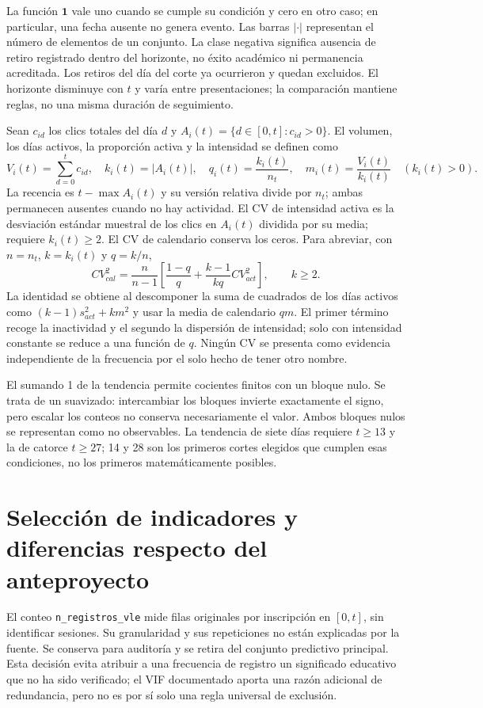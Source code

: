 La función $\mathbf 1$ vale uno cuando se cumple su condición y cero en otro caso; en particular, una fecha ausente no genera evento. Las barras $|\cdot|$ representan el número de elementos de un conjunto. La clase negativa significa ausencia de retiro registrado dentro del horizonte, no éxito académico ni permanencia acreditada. Los retiros del día del corte ya ocurrieron y quedan excluidos. El horizonte disminuye con $t$ y varía entre presentaciones; la comparación mantiene reglas, no una misma duración de seguimiento.

Sean $c_{id}$ los clics totales del día $d$ y $A_i(t)=\{d\in[0,t]:c_{id}>0\}$. El volumen, los días activos, la proporción activa y la intensidad se definen como
\begin{equation}
V_i(t)=\sum_{d=0}^t c_{id},\quad k_i(t)=|A_i(t)|,\quad q_i(t)=\frac{k_i(t)}{n_t},\quad m_i(t)=\frac{V_i(t)}{k_i(t)}\quad(k_i(t)>0).\label{corr:actividad}
\end{equation}
La recencia es $t-\max A_i(t)$ y su versión relativa divide por $n_t$; ambas permanecen ausentes cuando no hay actividad. El CV de intensidad activa es la desviación estándar muestral de los clics en $A_i(t)$ dividida por su media; requiere $k_i(t)\ge2$. El CV de calendario conserva los ceros. Para abreviar, con $n=n_t$, $k=k_i(t)$ y $q=k/n$,
\begin{equation}
CV_{cal}^{2}=\frac{n}{n-1}\left[\frac{1-q}{q}+\frac{k-1}{kq}CV_{act}^{2}\right],\qquad k\ge2.\label{corr:identidadcv}
\end{equation}
La identidad se obtiene al descomponer la suma de cuadrados de los días activos como $(k-1)s_{act}^{2}+k m^{2}$ y usar la media de calendario $qm$. El primer término recoge la inactividad y el segundo la dispersión de intensidad; solo con intensidad constante se reduce a una función de $q$. Ningún CV se presenta como evidencia independiente de la frecuencia por el solo hecho de tener otro nombre.

El sumando 1 de la tendencia permite cocientes finitos con un bloque nulo. Se trata de un suavizado: intercambiar los bloques invierte exactamente el signo, pero escalar los conteos no conserva necesariamente el valor. Ambos bloques nulos se representan como no observables. La tendencia de siete días requiere $t\ge13$ y la de catorce $t\ge27$; 14 y 28 son los primeros cortes elegidos que cumplen esas condiciones, no los primeros matemáticamente posibles.

\section{Selección de indicadores y diferencias respecto del anteproyecto}
El conteo \texttt{n\_registros\_vle} mide filas originales por inscripción en $[0,t]$, sin identificar sesiones. Su granularidad y sus repeticiones no están explicadas por la fuente. Se conserva para auditoría y se retira del conjunto predictivo principal. Esta decisión evita atribuir a una frecuencia de registro un significado educativo que no ha sido verificado; el VIF documentado aporta una razón adicional de redundancia, pero no es por sí solo una regla universal de exclusión.

